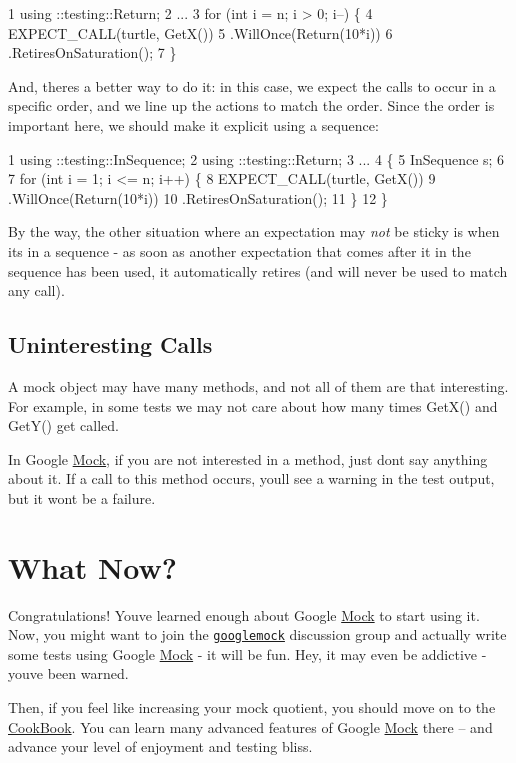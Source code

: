 \begin{DoxyCode}
1 using ::testing::Return;
2 ...
3 for (int i = n; i > 0; i--) \{
4   EXPECT\_CALL(turtle, GetX())
5     .WillOnce(Return(10*i))
6     .RetiresOnSaturation();
7 \}
\end{DoxyCode}


And, there\textquotesingle{}s a better way to do it\+: in this case, we expect the calls to occur in a specific order, and we line up the actions to match the order. Since the order is important here, we should make it explicit using a sequence\+:


\begin{DoxyCode}
1 using ::testing::InSequence;
2 using ::testing::Return;
3 ...
4 \{
5   InSequence s;
6 
7   for (int i = 1; i <= n; i++) \{
8     EXPECT\_CALL(turtle, GetX())
9         .WillOnce(Return(10*i))
10         .RetiresOnSaturation();
11   \}
12 \}
\end{DoxyCode}


By the way, the other situation where an expectation may {\itshape not} be sticky is when it\textquotesingle{}s in a sequence -\/ as soon as another expectation that comes after it in the sequence has been used, it automatically retires (and will never be used to match any call).

\subsection*{Uninteresting Calls}

A mock object may have many methods, and not all of them are that interesting. For example, in some tests we may not care about how many times {\ttfamily Get\+X()} and {\ttfamily Get\+Y()} get called.

In Google \hyperlink{class_mock}{Mock}, if you are not interested in a method, just don\textquotesingle{}t say anything about it. If a call to this method occurs, you\textquotesingle{}ll see a warning in the test output, but it won\textquotesingle{}t be a failure.

\section*{What Now?}

Congratulations! You\textquotesingle{}ve learned enough about Google \hyperlink{class_mock}{Mock} to start using it. Now, you might want to join the \href{http://groups.google.com/group/googlemock}{\tt googlemock} discussion group and actually write some tests using Google \hyperlink{class_mock}{Mock} -\/ it will be fun. Hey, it may even be addictive -\/ you\textquotesingle{}ve been warned.

Then, if you feel like increasing your mock quotient, you should move on to the \hyperlink{v1__7_2_cook_book_8md}{Cook\+Book}. You can learn many advanced features of Google \hyperlink{class_mock}{Mock} there -- and advance your level of enjoyment and testing bliss. 
